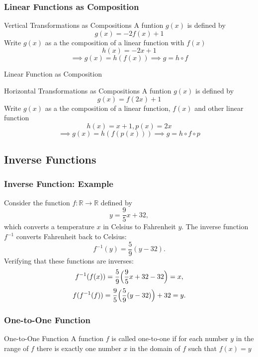 \documentclass{beamer}
\begin{document}
\begin{frame}
  \frametitle{Linear Functions as Composition}
  \begin{exampleblock}{Vertical Transformations as Compositions}
    A funtion \(g(x)\) is defined by 
    \[g(x)= -2f(x)+1\] 
    Write \(g(x)\) as a the composition of a linear function with \(f(x)\) 
    \[h(x) = -2x + 1 \]
    \[\implies g(x) = h(f(x)) \implies g = h \circ f \]
   \end{exampleblock}
  \end{frame}
  \begin{frame}{Linear Function as Composition}
   \begin{exampleblock}{Horizontal Transformations as Compositions}
    A funtion \(g(x)\) is defined by 
    \[g(x)= f(2x)+1\] 
    Write \(g(x)\) as a the composition of a linear function,  \(f(x)\) and other linear function 
    \[h(x) = x + 1, p(x) = 2x \]
    \[\implies g(x) = h(f(p(x))) \implies g = h \circ f \circ p \]
   \end{exampleblock}
\end{frame}
\subsection{Inverse Functions}
  \begin{frame}
    \frametitle{Inverse Function: Example}
      Consider the function \( f: \mathbb{R} \to \mathbb{R} \) defined by
      \[
      y = \frac{9}{5}x + 32,
      \]
      which converts a temperature \( x \) in Celsius to Fahrenheit \( y \).
      The inverse function \( f^{-1} \) converts Fahrenheit back to Celsius:
      \[
      f^{-1}(y) = \frac{5}{9}(y - 32).
      \]
      Verifying that these functions are inverses:
      \[
      f^{-1}(f(x)) = \frac{5}{9}\Bigl(\frac{9}{5}x + 32 - 32\Bigr) = x,
      \]
      \[
      f(f^{-1}(f)) = \frac{9}{5}\Bigl(\frac{5}{9}(y - 32)\Bigr) + 32 = y.
      \]
  \end{frame}
\begin{frame}
  \frametitle{One-to-One Function}
  \begin{block}{One-to-One Function}
    A function \(f\) is called one-to-one if for each number \(y\) in the range of \(f\) there is
  exactly one number \(x\) in the domain of \(f\) such that \(f (x) = y\)
  \end{block}
\end{frame}
\end{document}
